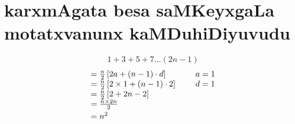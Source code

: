 \chapter{karxmAgata besa saMKeyxgaLa motatxvanunx kaMDuhiDiyuvudu}

$$
1+3+5+7\ldots(2n-1)
$$
$$
\begin{array}[t]{l}
=\frac{n}{2}\left[2a+(n-1)\cdot d\right] \\
=\frac{n}{2}\left[2\times 1 +(n-1)\cdot 2\right]\\
=\frac{n}{2}\left[2+2n-2\right]\\
=\frac{{n \times 2n}}{2}\\[0.1cm]
=n^{2}
\end{array}
\hspace{0.5cm}
\begin{array}[t]{l}
a = 1\\
d=1
\end{array}
$$
